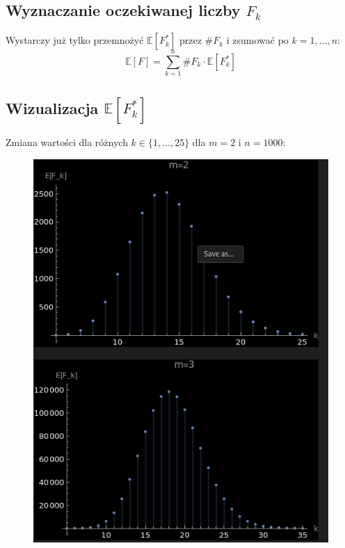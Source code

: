 \documentclass{article}
\begin{document}
\subsection{Wyznaczanie oczekiwanej liczby $F_k$}
Wystarczy już tylko przemnożyć $\mathbb{E}[F_k^*]$ przez $\#F_k$ i zsumować po $k=1, \ldots, n$:
\begin{dmath}
  \mathbb{E}[F] = \sum_{k=1}^n \#F_k \cdot \mathbb{E}[F_k^*]
\end{dmath}

\subsection{Wizualizacja $\mathbb{E}[F_k^*]$}
Zmiana wartości dla różnych $k \in \{1, \ldots, 25\}$ dla $m=2$ i $n=1000$:
\begin{figure}[h!]
  \centering
  \includegraphics[width=13cm]{../images/neighbourhood-size.png}
\end{figure}
\end{document}
